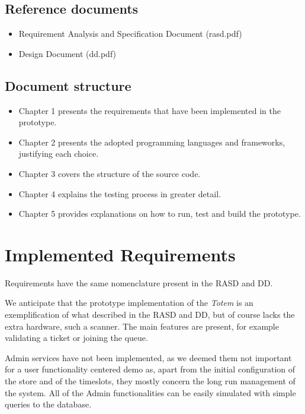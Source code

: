 \documentclass[
]{article}
\begin{document}
\hypertarget{reference-documents}{%
\subsection{Reference documents}\label{reference-documents}}

\begin{itemize}
\item
  Requirement Analysis and Specification Document (rasd.pdf)
\item
  Design Document (dd.pdf)
\end{itemize}

\hypertarget{document-structure}{%
\subsection{Document structure}\label{document-structure}}

\begin{itemize}
\item
  Chapter 1 presents the requirements that have been implemented in the
  prototype.
\item
  Chapter 2 presents the adopted programming languages and frameworks,
  justifying each choice.
\item
  Chapter 3 covers the structure of the source code.
\item
  Chapter 4 explains the testing process in greater detail.
\item
  Chapter 5 provides explanations on how to run, test and build the
  prototype.
\end{itemize}

\hypertarget{implemented-requirements}{%
\section{Implemented Requirements}\label{implemented-requirements}}

Requirements have the same nomenclature present in the RASD and DD.

We anticipate that the prototype implementation of the
\emph{Totem} is an exemplification of what described in the RASD and DD, but of course lacks the extra hardware, such a scanner.
The main features are present, for example validating a ticket or joining the queue.

Admin services have not been implemented, as we deemed them not important for a user functionality centered demo as, apart from the initial configuration of the store and of the timeslots, they mostly concern the long run management of the system. All of the Admin functionalities can be easily simulated with simple queries to the database.
\end{document}
